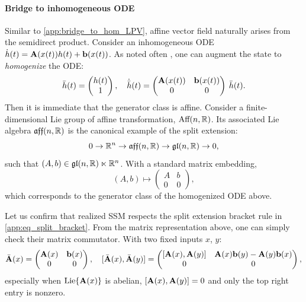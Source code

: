 \paragraph{Bridge to inhomogeneous ODE}
\label{app:bridge_to_general_LPV}
Similar to \cref{app:bridge_to_hom_LPV}, affine vector field naturally arises from the semidirect product.
Consider an inhomogeneous ODE $\dot{h}(t) = \mathbf{A}(x(t))h(t) + \mathbf{b}(x(t))$.
As noted often \cite{krener1975bilinear, krener1977decomposition, iserles2000lie},
one can augment the state to \emph{homogenize} the ODE:
\begin{equation*}
    \bar{h}(t) = \begin{pmatrix}
    h(t) \\
    1
\end{pmatrix},
\quad
\dot{\bar{h}}(t)
= \begin{pmatrix}
        \mathbf{A}(x(t)) & \mathbf{b}(x(t)) \\
        0 & 0
    \end{pmatrix}
    \:
    \bar{h}(t).
\end{equation*}
Then it is immediate that the generator class is affine.
Consider a finite-dimensional Lie group of affine transformation, $\text{Aff}(n, \mathbb{R})$.
Its associated Lie algebra $\mathfrak{aff}(n, \mathbb{R})$ is the canonical example of the split extension:
\begin{equation*}
    0 \to \mathbb{R}^n \to \mathfrak{aff}(n, \mathbb{R}) \to \mathfrak{gl}(n,\mathbb{R}) \to 0,
\end{equation*}
such that $(A,b) \in \mathfrak{gl}(n,\mathbb{R}) \ltimes \mathbb{R}^n$.
With a standard matrix embedding,
\begin{equation*}
    (A,b) \longmapsto \begin{pmatrix}
        A & b \\
        0 & 0
    \end{pmatrix},
\end{equation*}
which corresponds to the generator class of the homogenized ODE above.

Let us confirm that realized SSM respects the split extension bracket rule in \cref{app:eq_split_bracket}.
From the matrix representation above, one can simply check their matrix commutator.
With two fixed inputs $x$, $y$:
\begin{equation*}
    \bar{\mathbf{A}}(x) = \begin{pmatrix}
        \mathbf{A}(x) & \mathbf{b}(x) \\
        0 & 0
    \end{pmatrix},
    \quad
    [\bar{\mathbf{A}}(x), \bar{\mathbf{A}}(y)]
    =
    \begin{pmatrix}
        [\mathbf{A}(x), \mathbf{A}(y)]
        &
        \mathbf{A}(x)\mathbf{b}(y) - \mathbf{A}(y)\mathbf{b}(x) \\
        0 & 0
    \end{pmatrix},
\end{equation*}
especially when $\text{Lie}{\{\mathbf{A}(x)\}}$ is abelian, $[\mathbf{A}(x), \mathbf{A}(y)] = 0$ and only the top right entry is nonzero.

